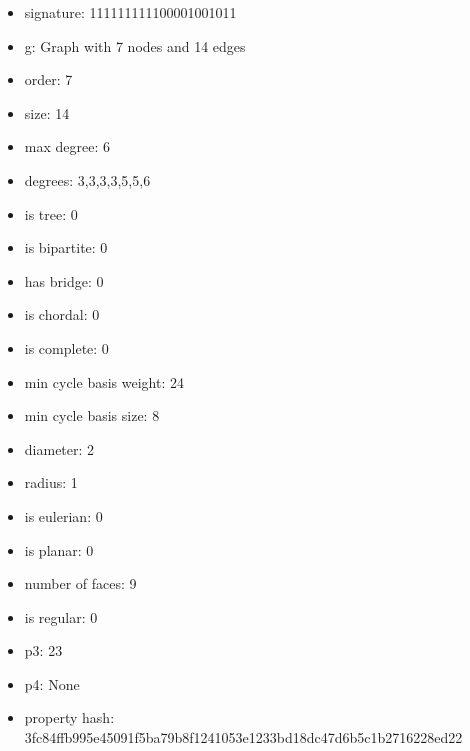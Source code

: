 \newpage
\begin{figure}
\end{figure}
\begin{itemize}
\item signature: 111111111100001001011
\item g: Graph with 7 nodes and 14 edges
\item order: 7
\item size: 14
\item max degree: 6
\item degrees: 3,3,3,3,5,5,6
\item is tree: 0
\item is bipartite: 0
\item has bridge: 0
\item is chordal: 0
\item is complete: 0
\item min cycle basis weight: 24
\item min cycle basis size: 8
\item diameter: 2
\item radius: 1
\item is eulerian: 0
\item is planar: 0
\item number of faces: 9
\item is regular: 0
\item p3: 23
\item p4: None
\item property hash: 3fc84ffb995e45091f5ba79b8f1241053e1233bd18dc47d6b5c1b2716228ed22
\end{itemize}
\newpage
